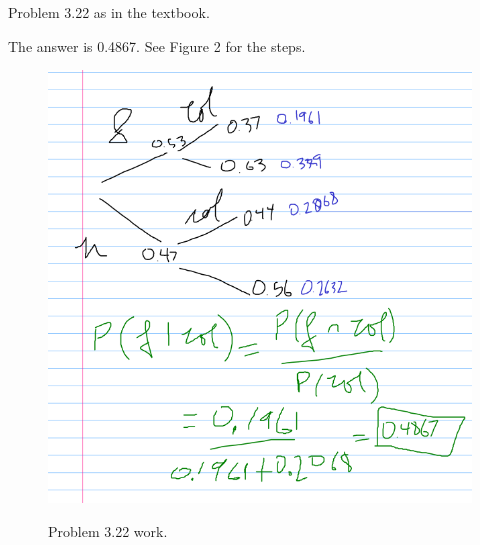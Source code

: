 \begin{prob}
   Problem 3.22 as in the textbook. 
\end{prob}
\begin{solution}
    The answer is 0.4867. See Figure 2 for the steps.
    \begin{figure}[H]
    \centering
     \includegraphics[width=0.6\linewidth]{hw_figures/hw1_voting.png}
    \label{hw1_voting}
    \caption{Problem 3.22 work.} 
    \end{figure}
\end{solution}
